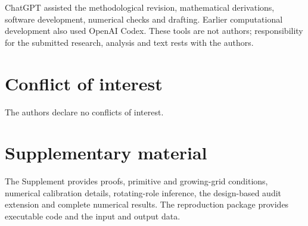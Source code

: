 ChatGPT assisted the methodological revision, mathematical derivations, software development, numerical checks and drafting. Earlier computational development also used OpenAI Codex. These tools are not authors; responsibility for the submitted research, analysis and text rests with the authors.

\section*{Conflict of interest}
The authors declare no conflicts of interest.

\section*{Supplementary material}
The Supplement provides proofs, primitive and growing-grid conditions, numerical calibration details, rotating-role inference, the design-based audit extension and complete numerical results. The reproduction package provides executable code and the input and output data.
